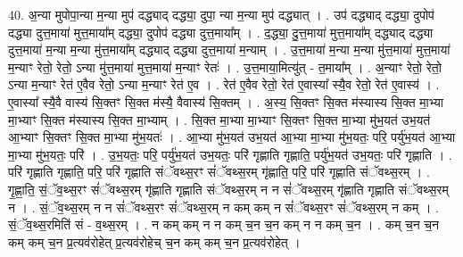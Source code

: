 \documentclass[17pt]{extarticle}
\begin{document}
40. अ॒न्या मुपोपा॒न्या म॒न्या मुप॑ दद्ध्याद् दद्ध्या॒ दुपा॒ न्या म॒न्या मुप॑ दद्ध्यात् । . उप॑ दद्ध्याद् दद्ध्या॒ दुपोप॑ दद्ध्या दुत्त॒माया॑ मुत्त॒माया᳚म् दद्ध्या॒ दुपोप॑ दद्ध्या दुत्त॒माया᳚म् । . द॒द्ध्या॒ दु॒त्त॒माया॑ मुत्त॒माया᳚म् दद्ध्याद् दद्ध्या दुत्त॒माया॑ म॒न्या म॒न्या मु॑त्त॒माया᳚म् दद्ध्याद् दद्ध्या दुत्त॒माया॑ म॒न्याम् । . उ॒त्त॒माया॑ म॒न्या म॒न्या मु॑त्त॒माया॑ मुत्त॒माया॑ म॒न्याꣳ रेतो॒ रेतो॒ ऽन्या मु॑त्त॒माया॑ मुत्त॒माया॑ म॒न्याꣳ रेतः॑ । . उ॒त्त॒माया॒मित्यु॑त् - त॒माया᳚म् । . अ॒न्याꣳ रेतो॒ रेतो॒ ऽन्या म॒न्याꣳ रेत॑ ए॒वैव रेतो॒ ऽन्या म॒न्याꣳ रेत॑ ए॒व । . रेत॑ ए॒वैव रेतो॒ रेत॑ ए॒वास्या᳚ स्यै॒व रेतो॒ रेत॑ ए॒वास्य॑ । . ए॒वास्या᳚ स्यै॒वै वास्य॑ सि॒क्तꣳ सि॒क्त म॑स्यै॒ वैवास्य॑ सि॒क्तम् । . अ॒स्य॒ सि॒क्तꣳ सि॒क्त म॑स्यास्य सि॒क्त मा॒भ्या मा॒भ्याꣳ सि॒क्त म॑स्यास्य सि॒क्त मा॒भ्याम् । . सि॒क्त मा॒भ्या मा॒भ्याꣳ सि॒क्तꣳ सि॒क्त मा॒भ्या मु॑भ॒यत॑ उभ॒यत॑ आ॒भ्याꣳ सि॒क्तꣳ सि॒क्त मा॒भ्या मु॑भ॒यतः॑ । . आ॒भ्या मु॑भ॒यत॑ उभ॒यत॑ आ॒भ्या मा॒भ्या मु॑भ॒यतः॒ परि॒ पर्यु॑भ॒यत॑ आ॒भ्या मा॒भ्या मु॑भ॒यतः॒ परि॑ । . उ॒भ॒यतः॒ परि॒ पर्यु॑भ॒यत॑ उभ॒यतः॒ परि॑ गृह्णाति गृह्णाति॒ पर्यु॑भ॒यत॑ उभ॒यतः॒ परि॑ गृह्णाति । . परि॑ गृह्णाति गृह्णाति॒ परि॒ परि॑ गृह्णाति संॅवथ्स॒रꣳ सं॑ॅवथ्स॒रम् गृ॑ह्णाति॒ परि॒ परि॑ गृह्णाति संॅवथ्स॒रम् । . गृ॒ह्णा॒ति॒ सं॒ॅव॒थ्स॒रꣳ सं॑ॅवथ्स॒रम् गृ॑ह्णाति गृह्णाति संॅवथ्स॒रम् न न सं॑ॅवथ्स॒रम् गृ॑ह्णाति गृह्णाति संॅवथ्स॒रम् न । . सं॒ॅव॒थ्स॒रम् न न सं॑ॅवथ्स॒रꣳ सं॑ॅवथ्स॒रम् न कम् कम् न सं॑ॅवथ्स॒रꣳ सं॑ॅवथ्स॒रम् न कम् । . सं॒ॅव॒थ्स॒रमिति॑ सं - व॒थ्स॒रम् । . न कम् कम् न न कम् च॒न च॒न कम् न न कम् च॒न । . कम् च॒न च॒न कम् कम् च॒न प्र॒त्यव॑रोहेत् प्र॒त्यव॑रोहेच् च॒न कम् कम् च॒न प्र॒त्यव॑रोहेत् । \newline
\pagebreak
{}
\end{document}

